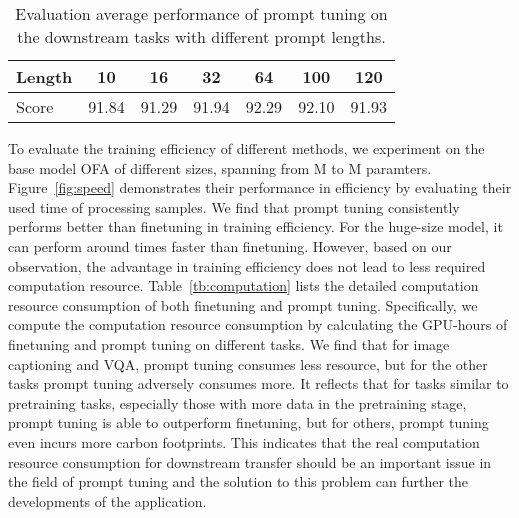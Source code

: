 \documentclass[11pt]{article}
\begin{document}
\begin{table}[t]
\center
\small
\vskip 0.15in
\begin{adjustbox}{max width=0.5\textwidth}
\begin{tabular}{@{\extracolsep{\fill}}lcccccc}
\toprule
 
  Length & 10 & 16 & 32 & 64 & 100 & 120
  \\
\midrule
  Score & 91.84 & 91.29 & 91.94 & 92.29 & 92.10 & 91.93






\\
\bottomrule
\end{tabular}
\end{adjustbox}
\caption{Evaluation average performance of prompt tuning on the downstream tasks with different prompt lengths. }
\label{tb:prompt_length}
\end{table}
 
To evaluate the training efficiency of different methods, we experiment on the base model OFA of different sizes, spanning from M to M paramters. 
Figure~\ref{fig:speed} demonstrates their performance in efficiency by evaluating their used time of processing  samples. 
We find that prompt tuning consistently performs better than finetuning in training efficiency. 
For the huge-size model, it can perform around  times faster than finetuning. 
However, based on our observation, the advantage in training efficiency does not lead to less required computation resource. 
Table~\ref{tb:computation} lists the detailed computation resource consumption of both finetuning and prompt tuning.
Specifically, we compute the computation resource consumption by calculating the GPU-hours of finetuning and prompt tuning on different tasks. 
We find that for image captioning and VQA, prompt tuning consumes less resource, but for the other tasks prompt tuning adversely consumes more. 
It reflects that for tasks similar to pretraining tasks, especially those with more data in the pretraining stage, prompt tuning is able to outperform finetuning, but for others, prompt tuning even incurs more carbon footprints. 
This indicates that the real computation resource consumption for downstream transfer should be an important issue in the field of prompt tuning and the solution to this problem can further the developments of the application. 







 
\end{document}
